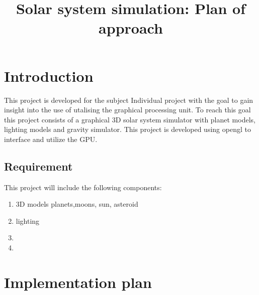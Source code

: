 \documentclass[letterpaper,10pt]{article}
\begin{document}
\title{Solar system simulation: Plan of approach}

\tableofcontents
\newpage
\section{Introduction}
This project is developed for the subject Individual project with the goal to gain insight into the use of utalising the graphical processing unit.
To reach this goal this project consists of a graphical 3D solar system simulator with planet models, lighting models and gravity simulator.
This project is developed using opengl to interface and utilize the GPU.
\subsection{Requirement}
This project will include the following components:
\begin{enumerate}
    \item 3D models {planets,moons, sun, asteroid}
    \item lighting 
    \item 
    \item 
\end{enumerate}
\section{Implementation plan}



\printbibliography
\end{document}
